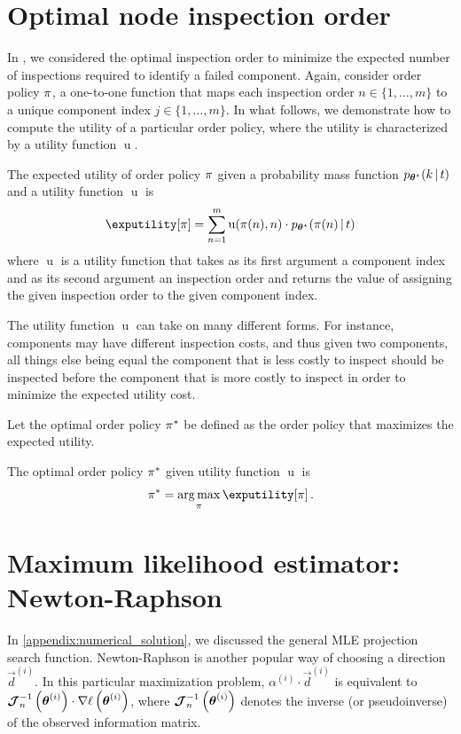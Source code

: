 \documentclass[
    11pt,
    extrafontsizes,
    article,
    oldfontcommands,
    final,
    oneside,
    openany,
    hidelinks]{memoir}
\begin{document}
\chapter{Optimal node inspection order}
In , we considered the optimal inspection order to minimize the expected number of inspections required to identify a failed component. Again, consider order policy $\operatorname{\pi}$, a one-to-one function that maps each inspection order $n \in \{1, \ldots, m\}$ to a unique component index $j \in \{1, \ldots, m\}$. In what follows, we demonstrate how to compute the utility of a particular order policy, where the utility is characterized by a utility function $\operatorname{u}$.
\begin{definition}
The expected utility of order policy $\operatorname{\pi}$ given a probability mass function $p_{{\boldsymbol{\mathbf{\theta}}}^{\star}}(k {\,|\,} t)$ and a utility function $\operatorname{u}$ is
\begin{equation}
\label{eq:expected_utility}
    \exputility[\orderfunc] = \sum_{n=1}^{m} \operatorname{u}(\orderfunc(n), n)
        \cdot \pmf_{\tparam{\vec\theta}}(\orderfunc(n) \given t)
\end{equation}
where $\operatorname{u}$ is a utility function that takes as its first argument a component index and as its second argument an inspection order and returns the value of assigning the given inspection order to the given component index.
\end{definition}
The utility function $\operatorname{u}$ can take on many different forms. For instance, components may have different inspection costs, and thus given two components, all things else being equal the component that is less costly to inspect should be inspected before the component that is more costly to inspect in order to minimize the expected utility cost.

Let the optimal order policy $\operatorname{\pi}^{*}$ be defined as the order policy that maximizes the expected utility.
\begin{definition}
The optimal order policy $\operatorname{\pi}^{*}$ given utility function $\operatorname{u}$ is
\begin{equation}
    \orderfunc^{*} = \argmax_{\orderfunc} \exputility[\orderfunc]\,.
\end{equation}
\end{definition}

\chapter{Maximum likelihood estimator: Newton-Raphson}
In \cref{appendix:numerical_solution}, we discussed the general MLE projection search function. Newton-Raphson is another popular way of choosing a direction $\vec{d}^{(i)}$. In this particular maximization problem, $\alpha^{(i)} \cdot \vec{d}^{(i)}$ is equivalent to $\operatorname{\boldsymbol{\mathcal{J}}}^{-1}_{n}\left(\boldsymbol{\mathbf{\theta}}^{(i)}\right) \cdot \nabla \ell \left(\boldsymbol{\mathbf{\theta}}^{(i)}\right)$, where $\operatorname{\boldsymbol{\mathcal{J}}}^{-1}_{n}\left(\boldsymbol{\mathbf{\theta}}^{(i)}\right)$ denotes the inverse (or pseudoinverse) of the observed information matrix.
\end{document}
